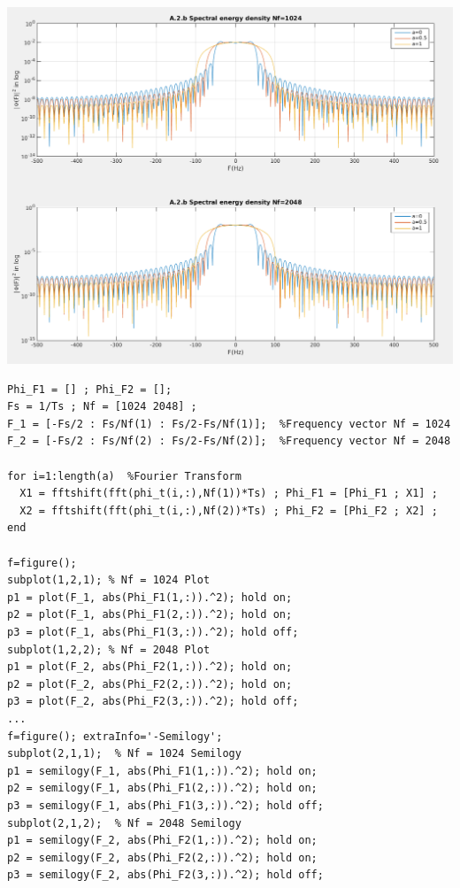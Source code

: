 \documentclass[11pt]{article}
\begin{document}
    \begin{center}
        \includegraphics[scale=0.4]{photos/A.2 Fourier Transform phi(F)-Semilogy__screenshot.png}
    \end{center} 
    
\begin{lstlisting}[caption = {Α.2}]
Phi_F1 = [] ; Phi_F2 = [];
Fs = 1/Ts ; Nf = [1024 2048] ;              
F_1 = [-Fs/2 : Fs/Nf(1) : Fs/2-Fs/Nf(1)];  %Frequency vector Nf = 1024
F_2 = [-Fs/2 : Fs/Nf(2) : Fs/2-Fs/Nf(2)];  %Frequency vector Nf = 2048

for i=1:length(a)  %Fourier Transform
  X1 = fftshift(fft(phi_t(i,:),Nf(1))*Ts) ; Phi_F1 = [Phi_F1 ; X1] ;
  X2 = fftshift(fft(phi_t(i,:),Nf(2))*Ts) ; Phi_F2 = [Phi_F2 ; X2] ; 
end

f=figure();
subplot(1,2,1); % Nf = 1024 Plot
p1 = plot(F_1, abs(Phi_F1(1,:)).^2); hold on;
p2 = plot(F_1, abs(Phi_F1(2,:)).^2); hold on;
p3 = plot(F_1, abs(Phi_F1(3,:)).^2); hold off;
subplot(1,2,2); % Nf = 2048 Plot
p1 = plot(F_2, abs(Phi_F2(1,:)).^2); hold on;
p2 = plot(F_2, abs(Phi_F2(2,:)).^2); hold on;
p3 = plot(F_2, abs(Phi_F2(3,:)).^2); hold off;
...
f=figure(); extraInfo='-Semilogy';
subplot(2,1,1);  % Nf = 1024 Semilogy
p1 = semilogy(F_1, abs(Phi_F1(1,:)).^2); hold on;
p2 = semilogy(F_1, abs(Phi_F1(2,:)).^2); hold on;
p3 = semilogy(F_1, abs(Phi_F1(3,:)).^2); hold off;
subplot(2,1,2);  % Nf = 2048 Semilogy
p1 = semilogy(F_2, abs(Phi_F2(1,:)).^2); hold on;
p2 = semilogy(F_2, abs(Phi_F2(2,:)).^2); hold on;
p3 = semilogy(F_2, abs(Phi_F2(3,:)).^2); hold off;
\end{lstlisting}
    
\end{document}
